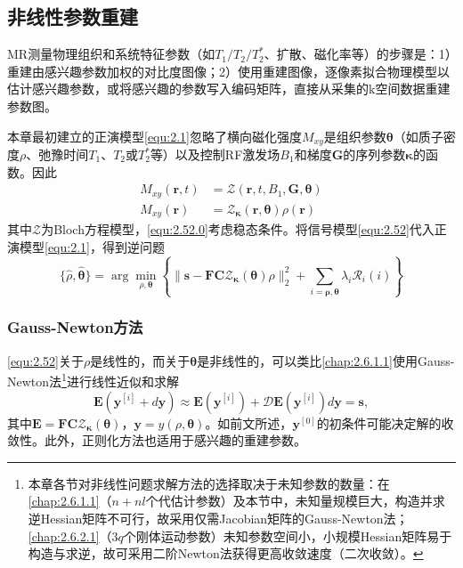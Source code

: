 \documentclass[12pt]{article}
\begin{document}
\subsection{非线性参数重建}
MR测量物理组织和系统特征参数（如$T_1/T_2/T_2^*$、扩散、磁化率等）的步骤是：1）重建由感兴趣参数加权的对比度图像；2）使用重建图像，逐像素拟合物理模型以估计感兴趣参数，或将感兴趣的参数写入编码矩阵，直接从采集的k空间数据重建参数图。

本章最初建立的正演模型\autoref{equ:2.1}忽略了横向磁化强度$M_{xy}$是组织参数$\bm{\theta}$（如质子密度$\rho$、弛豫时间$T_1$、$T_2$或$T_2^*$等）以及控制RF激发场$B_1$和梯度$\bm{G}$的序列参数$\bm{\kappa}$的函数。因此
\begin{align}
    M_{xy}(\bm{r},t)&=\mathcal{Z}(\bm{r},t,B_1,\bm{G},\bm{\theta}) \\
    M_{xy}(\bm{r})&=\mathcal{Z}_{\bm{\kappa}}(\bm{r},\bm{\theta})\rho(\bm{r}) \label{equ:2.52.0}
\end{align}
其中$\mathcal{Z}$为Bloch方程模型，\autoref{equ:2.52.0}考虑稳态条件。将信号模型\autoref{equ:2.52}代入正演模型\autoref{equ:2.1}，得到逆问题
\begin{equation}
    \{\hat{\rho},\hat{\bm{\theta}}\}=\arg\min_{\rho,\bm{\theta}}\left\{\|\bm{s}-\mathbf{F}\mathbf{C}\mathcal{Z}_{\bm{\kappa}}(\bm{\theta})\rho\|_2^2+\sum_{i=\bm{\rho},\bm{\theta}} \lambda_i\mathcal{R}_i(i)\right\}
    \label{equ:2.52}
\end{equation}

\subsubsection{Gauss-Newton方法}
\autoref{equ:2.52}关于$\rho$是线性的，而关于$\bm{\theta}$是非线性的，可以类比\autoref{chap:2.6.1.1}使用Gauss-Newton法\footnote{本章各节对非线性问题求解方法的选择取决于未知参数的数量：在\autoref{chap:2.6.1.1}（$n+nl$个代估计参数）及本节中，未知量规模巨大，构造并求逆Hessian矩阵不可行，故采用仅需Jacobian矩阵的Gauss-Newton法；\autoref{chap:2.6.2.1}（$3q$个刚体运动参数）未知参数空间小，小规模Hessian矩阵易于构造与求逆，故可采用二阶Newton法获得更高收敛速度（二次收敛）。}进行线性近似和求解
\begin{equation}
    \mathbf{E}\left(\bm{y}^{[i]}+d\bm{y}\right)\approx\mathbf{E}\left(\bm{y}^{[i]}\right)+\mathcal{D}\mathbf{E}\left(\bm{y}^{[i]}\right)d\bm{y}=\bm{s},
    \label{equ:2.53}
\end{equation}
其中$\mathbf{E}=\mathbf{F}\mathbf{C}\mathcal{Z}_{\bm{\kappa}}(\bm{\theta})$，$\bm{y}=y(\rho,\bm{\theta})$。如前文所述，$\bm{y}^{[0]}$的初条件可能决定解的收敛性。此外，正则化方法也适用于感兴趣的重建参数。
\end{document}
